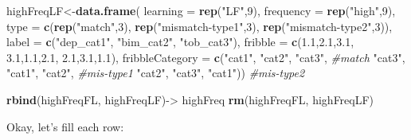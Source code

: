 \documentclass[
]{article}
\newenvironment{Shaded}{\begin{snugshade}}{\end{snugshade}}
\newcommand{\CommentTok}[1]{\textcolor[rgb]{0.56,0.35,0.01}{\textit{#1}}}
\newcommand{\DataTypeTok}[1]{\textcolor[rgb]{0.13,0.29,0.53}{#1}}
\newcommand{\DecValTok}[1]{\textcolor[rgb]{0.00,0.00,0.81}{#1}}
\newcommand{\FloatTok}[1]{\textcolor[rgb]{0.00,0.00,0.81}{#1}}
\newcommand{\KeywordTok}[1]{\textcolor[rgb]{0.13,0.29,0.53}{\textbf{#1}}}
\newcommand{\NormalTok}[1]{#1}
\newcommand{\StringTok}[1]{\textcolor[rgb]{0.31,0.60,0.02}{#1}}
\begin{document}
\begin{Shaded}
\begin{Highlighting}[]
\NormalTok{highFreqLF<-}\KeywordTok{data.frame}\NormalTok{(}
           \DataTypeTok{learning =} \KeywordTok{rep}\NormalTok{(}\StringTok{"LF"}\NormalTok{,}\DecValTok{9}\NormalTok{),}
           \DataTypeTok{frequency =} \KeywordTok{rep}\NormalTok{(}\StringTok{"high"}\NormalTok{,}\DecValTok{9}\NormalTok{),}
           \DataTypeTok{type =} \KeywordTok{c}\NormalTok{(}\KeywordTok{rep}\NormalTok{(}\StringTok{"match"}\NormalTok{,}\DecValTok{3}\NormalTok{), }
                    \KeywordTok{rep}\NormalTok{(}\StringTok{"mismatch-type1"}\NormalTok{,}\DecValTok{3}\NormalTok{), }
                    \KeywordTok{rep}\NormalTok{(}\StringTok{"mismatch-type2"}\NormalTok{,}\DecValTok{3}\NormalTok{)),}
           \DataTypeTok{label =} \KeywordTok{c}\NormalTok{(}\StringTok{"dep_cat1"}\NormalTok{, }\StringTok{"bim_cat2"}\NormalTok{, }\StringTok{"tob_cat3"}\NormalTok{),}
           \DataTypeTok{fribble =} \KeywordTok{c}\NormalTok{(}\FloatTok{1.1}\NormalTok{,}\FloatTok{2.1}\NormalTok{,}\FloatTok{3.1}\NormalTok{,}
                       \FloatTok{3.1}\NormalTok{,}\FloatTok{1.1}\NormalTok{,}\FloatTok{2.1}\NormalTok{,}
                       \FloatTok{2.1}\NormalTok{,}\FloatTok{3.1}\NormalTok{,}\FloatTok{1.1}\NormalTok{),}
           \DataTypeTok{fribbleCategory =} \KeywordTok{c}\NormalTok{(}\StringTok{"cat1"}\NormalTok{, }\StringTok{"cat2"}\NormalTok{, }\StringTok{"cat3"}\NormalTok{, }\CommentTok{#match}
                        \StringTok{"cat3"}\NormalTok{, }\StringTok{"cat1"}\NormalTok{, }\StringTok{"cat2"}\NormalTok{, }\CommentTok{#mis-type1}
                        \StringTok{"cat2"}\NormalTok{, }\StringTok{"cat3"}\NormalTok{, }\StringTok{"cat1"}\NormalTok{)) }\CommentTok{#mis-type2}

\KeywordTok{rbind}\NormalTok{(highFreqFL, highFreqLF)->}\StringTok{ }\NormalTok{highFreq}
\KeywordTok{rm}\NormalTok{(highFreqFL, highFreqLF)}
\end{Highlighting}
\end{Shaded}

Okay, let's fill each row:
\end{document}
